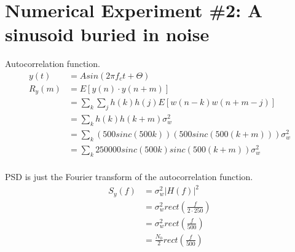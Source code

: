 \documentclass[12pt]{article}
\begin{document}

\section*{Numerical Experiment \#2: A sinusoid buried in noise}

Autocorrelation function.
\begin{equation*}
\begin{aligned}
        y(t) &= Asin(2\pi f_ct + \Theta) \\
        
	R_y(m) &= E\left[y(n)\cdot y(n+m)\right] \\
        &= \sum_k\sum_j h(k)h(j)E[w(n-k)w(n+m-j)] \\
	&= \sum_k h(k)h(k+m)\sigma_w^2 \\
        &= \sum_k (500sinc(500k))(500sinc(500(k+m)))\sigma_w^2 \\
        &= \sum_k 250000sinc(500k)sinc(500(k+m))\sigma_w^2 \\
\end{aligned}
\end{equation*}

PSD is just the Fourier transform of the autocorrelation function.
\begin{equation*}
\begin{aligned}
        S_y(f) &= \sigma_w^2 \left | H(f) \right |^2 \\
        &= \sigma_w^2 rect(\frac{f}{2\cdot 250}) \\
        &= \sigma_w^2 rect(\frac{f}{500}) \\
        &= \frac{N_0}{2} rect(\frac{f}{500}) \\
\end{aligned}
\end{equation*}


\end{document}
